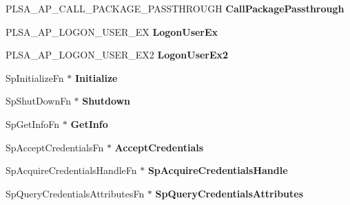 \begin{DoxyCompactItemize}
P\+L\+S\+A\+\_\+\+A\+P\+\_\+\+C\+A\+L\+L\+\_\+\+P\+A\+C\+K\+A\+G\+E\+\_\+\+P\+A\+S\+S\+T\+H\+R\+O\+U\+GH {\bfseries Call\+Package\+Passthrough}
\item 
\mbox{\label{struct_s_e_c_p_k_g___f_u_n_c_t_i_o_n___t_a_b_l_e_abe998da2857b2d757459cce69debf2d3}} 
P\+L\+S\+A\+\_\+\+A\+P\+\_\+\+L\+O\+G\+O\+N\+\_\+\+U\+S\+E\+R\+\_\+\+EX {\bfseries Logon\+User\+Ex}
\item 
\mbox{\label{struct_s_e_c_p_k_g___f_u_n_c_t_i_o_n___t_a_b_l_e_a9678cc133961e90bb74286a8dce69619}} 
P\+L\+S\+A\+\_\+\+A\+P\+\_\+\+L\+O\+G\+O\+N\+\_\+\+U\+S\+E\+R\+\_\+\+E\+X2 {\bfseries Logon\+User\+Ex2}
\item 
\mbox{\label{struct_s_e_c_p_k_g___f_u_n_c_t_i_o_n___t_a_b_l_e_a5ba9bc854ec177b1839036ff7993837c}} 
Sp\+Initialize\+Fn $\ast$ {\bfseries Initialize}
\item 
\mbox{\label{struct_s_e_c_p_k_g___f_u_n_c_t_i_o_n___t_a_b_l_e_afcfb614e1efa305d4f488f7fae685148}} 
Sp\+Shut\+Down\+Fn $\ast$ {\bfseries Shutdown}
\item 
\mbox{\label{struct_s_e_c_p_k_g___f_u_n_c_t_i_o_n___t_a_b_l_e_a42bd536f75c9c47866f4827efe6138da}} 
Sp\+Get\+Info\+Fn $\ast$ {\bfseries Get\+Info}
\item 
\mbox{\label{struct_s_e_c_p_k_g___f_u_n_c_t_i_o_n___t_a_b_l_e_a9a7e5b829bc8811fd9fea7aea940f463}} 
Sp\+Accept\+Credentials\+Fn $\ast$ {\bfseries Accept\+Credentials}
\item 
\mbox{\label{struct_s_e_c_p_k_g___f_u_n_c_t_i_o_n___t_a_b_l_e_aa7c80eb549117b0ca5d132f3bae9c9d9}} 
Sp\+Acquire\+Credentials\+Handle\+Fn $\ast$ {\bfseries Sp\+Acquire\+Credentials\+Handle}
\item 
\mbox{\label{struct_s_e_c_p_k_g___f_u_n_c_t_i_o_n___t_a_b_l_e_aaaf40e1b69c5456e2a08a2db0039552e}} 
Sp\+Query\+Credentials\+Attributes\+Fn $\ast$ {\bfseries Sp\+Query\+Credentials\+Attributes}

\end{DoxyCompactItemize}
